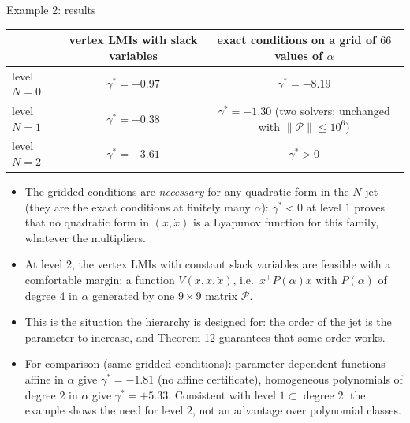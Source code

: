 \documentclass[10pt,aspectratio=169]{beamer}
\newcommand{\tr}{^{\top}}
\newcommand{\PP}{\mathcal{P}}
\begin{document}
\begin{frame}{Example 2: results}
\begin{center}
\begin{tabular}{lcc}\toprule
 & vertex LMIs with slack variables & exact conditions on a grid of $66$ values of $\alpha$\\\midrule
level $N=0$ & $\gamma^*=-0.97$ & $\gamma^*=-8.19$\\
level $N=1$ & $\gamma^*=-0.38$ & $\gamma^*=-1.30$ (two solvers; unchanged with $\|\PP\|\le10^6$)\\
level $N=2$ & $\gamma^*=+3.61$ & $\gamma^*>0$\\\bottomrule
\end{tabular}
\end{center}
\begin{itemize}
\item The gridded conditions are \emph{necessary} for any quadratic form in the $N$-jet (they are the exact conditions at finitely many $\alpha$): $\gamma^*<0$ at level $1$ proves that \alert{no quadratic form in $(x,\dot x)$ is a Lyapunov function for this family}, whatever the multipliers.
\item At level $2$, the vertex LMIs with constant slack variables are feasible with a comfortable margin: a function $V(x,\dot x,\ddot x)$, i.e.\ $x\tr P(\alpha)x$ with $P(\alpha)$ of degree $4$ in $\alpha$ generated by one $9\times9$ matrix $\PP$.
\item This is the situation the hierarchy is designed for: the order of the jet is the parameter to increase, and Theorem 12 guarantees that some order works.
\item For comparison (same gridded conditions): parameter-dependent functions affine in $\alpha$ give $\gamma^*=-1.81$ (no affine certificate), homogeneous polynomials of degree $2$ in $\alpha$ give $\gamma^*=+5.33$. Consistent with level $1\subset$ degree $2$: the example shows the need for level $2$, not an advantage over polynomial classes.
\end{itemize}
\end{frame}
\end{document}
